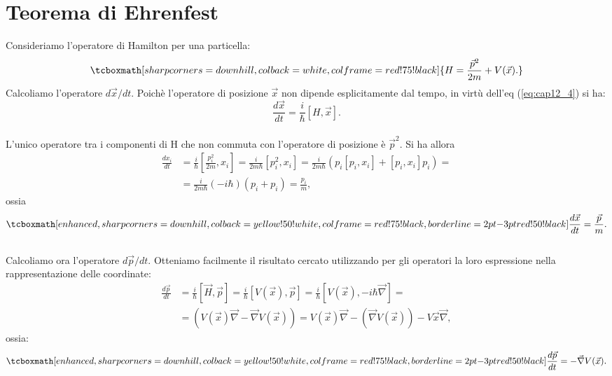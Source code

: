 \documentclass[a4paper,12pt,oneside]{book}
\begin{document}
\section[Teorema di Ehrenfest]{Teorema di Ehrenfest}
Consideriamo l'operatore di Hamilton per una particella:
	\begin{equation}
		\tcboxmath[sharp corners=downhill, colback=white, colframe=red!75!black]{
			H= \frac{\vec{p}^2}{2m} + {V}(\vec{x}).
			}
	\end{equation}
Calcoliamo l'operatore $d\vec{x}/dt$. Poichè l'operatore di posizione $\vec{x}$ non dipende esplicitamente dal tempo, in virtù dell'eq (\ref{eq:cap12_4}) si ha:
	\begin{equation}
		\frac{d\vec{x}}{dt}= \frac{i}{\hbar}[H,\vec{x}].
	\end{equation}\\

L'unico operatore tra i componenti di H che non commuta con l'operatore di posizione è $\vec{p}^2$. Si ha allora 
	\begin{align}
		\frac{dx_i}{dt}&=\frac{i}{\hbar} \left[ \frac{p_i^2}{2m},x_i \right]= \frac{i}{2m\hbar}\left[ p_i ^2 ,x_i \right] = \frac{i}{2m\hbar}\left(p_i\left[ p_i, x_i\right]+\left[p_i , x_i \right]p_i\right)= \nonumber \\
		&= \frac{i}{2m\hbar }\left( -i\hbar \right) \left( p_i +p_i \right)=\frac{p_i}{m},
	\end{align}
ossia
	\begin{equation}
   	\label{eq:cap12_6}
		\tcboxmath[enhanced, sharp corners=downhill, colback=yellow!50!white, colframe=red!75!black, borderline={2pt}{-3pt}{red!50!black}]{
			\frac{d\vec{x}}{dt}=\frac{\vec{p}}{m}.
			}
	\end{equation}\\
	
Calcoliamo ora l'operatore ${d\vec{p}}/{dt}$. Otteniamo facilmente il risultato cercato utilizzando per gli operatori la loro espressione nella rappresentazione delle coordinate:\\
	\begin{align}
		\frac{d\vec{p}}{dt}&=\frac{i}{\hbar}[\vec{H},\vec{p}]=\frac{i}{\hbar}[V(\vec{x}),\vec{p}]=  \frac{i}{\hbar}[V(\vec{x}),-i\hbar\vec{\nabla}]= \nonumber \\
		&= (V(\vec{x})\vec{\nabla}-\vec{\nabla}V(\vec{x}))= V(\vec{x})\vec{\nabla}-(\vec{\nabla}V(\vec{x}))-V	\vec{x}\vec{\nabla},
	\end{align}
ossia:
	\begin{equation}
	\label{eq:cap12_7}
		\tcboxmath[enhanced, sharp corners=downhill, colback=yellow!50!white, colframe=red!75!black, borderline={2pt}{-3pt}{red!50!black}]{
			\frac{d\vec{p}}{dt}=-\vec{\nabla}V(\vec{x}).
			}
	\end{equation}\\
	
\end{document}
